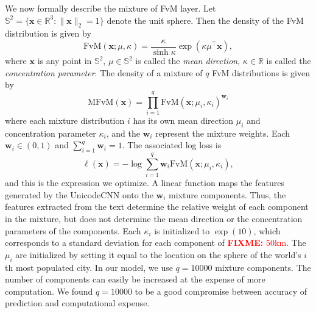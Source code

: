 \documentclass[sigconf,10pt]{acmart}
\newcommand{\defn}[1]{\textit{#1}}
\newcommand{\trans}[1]{{#1}^{\top}}
\newcommand{\ltwo}[1]{\lVert {#1} \rVert_2}
\newcommand{\w}{\mathbf{w}}
\newcommand{\x}{\mathbf{x}}
\newcommand{\fixme}[1]{\textcolor{red}{\textbf{FIXME:} {#1}}}
\begin{document}
\begin{description}
        We now formally describe the mixture of FvM layer.
        Let $\mathbb{S}^2 = \{ \x \in \mathbb R^3 : \ltwo{\x}=1 \}$ denote the unit sphere.
        Then the density of the FvM distribution is given by
        \begin{equation}
            \text{FvM}(\x;\mu,\kappa) = \frac{\kappa}{\sinh \kappa} \exp(\kappa\trans\mu\x),
        \end{equation}
        where 
        $\x$ is any point in $\mathbb{S}^2$,
        $\mu\in\mathbb{S}^2$ is called the \defn{mean direction},
        $\kappa\in\mathbb R$ is called the \defn{concentration parameter}.
        The density of a mixture of $q$ FvM distributions is given by
        \begin{equation}
            \text{MFvM}(\x) = \prod_{i=1}^q \text{FvM}(\x;\mu_i,\kappa_i)^{\w_i}
        \end{equation}
        where each mixture distribution $i$ has its own mean direction $\mu_i$ and concentration parameter $\kappa_i$, 
        and the $\w_i$ represent the mixture weights.
        Each $\w_i\in(0,1)$ and $\sum_{i=1}^q \w_i = 1$.
        The associated log loss is 
        \begin{equation}
            \ell(\x) = -\log\sum_{i=1}^q {\w}_i \text{FvM}(\x;\mu_i,\kappa_i),
        \end{equation}
        and this is the expression we optimize.
        A linear function maps the features generated by the UnicodeCNN onto the $\w_i$ mixture components.
        Thus, the features extracted from the text determine the relative weight of each component in the mixture,
        but does not determine the mean direction or the concentration parameters of the components.
        Each $\kappa_i$ is initialized to $\exp(10)$,
        which corresponds to a standard deviation for each component of \fixme{50km}.
        The $\mu_i$ are initialized by setting it equal to the location on the sphere of the world's $i$th most populated city.
        In our model, we use $q=10000$ mixture components. 
        The number of components can easily be increased at the expense of more computation.
        We found $q=10000$ to be a good compromise between accuracy of prediction and computational expense.


\end{description}
\end{document}
